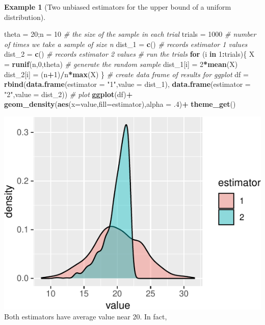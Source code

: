 \documentclass[
]{book}
\newenvironment{Shaded}{\begin{snugshade}}{\end{snugshade}}
\newcommand{\AttributeTok}[1]{\textcolor[rgb]{0.13,0.29,0.53}{#1}}
\newcommand{\CommentTok}[1]{\textcolor[rgb]{0.56,0.35,0.01}{\textit{#1}}}
\newcommand{\ControlFlowTok}[1]{\textcolor[rgb]{0.13,0.29,0.53}{\textbf{#1}}}
\newcommand{\DecValTok}[1]{\textcolor[rgb]{0.00,0.00,0.81}{#1}}
\newcommand{\FunctionTok}[1]{\textcolor[rgb]{0.13,0.29,0.53}{\textbf{#1}}}
\newcommand{\NormalTok}[1]{#1}
\newcommand{\OtherTok}[1]{\textcolor[rgb]{0.56,0.35,0.01}{#1}}
\newcommand{\SpecialCharTok}[1]{\textcolor[rgb]{0.81,0.36,0.00}{\textbf{#1}}}
\newcommand{\StringTok}[1]{\textcolor[rgb]{0.31,0.60,0.02}{#1}}
\theoremstyle{definition}
\theoremstyle{definition}
\newtheorem{example}{Example}[chapter]
\theoremstyle{definition}
\theoremstyle{definition}
\theoremstyle{remark}
\begin{document}
\begin{example}[Two unbiased estimators for the upper bound of a uniform distribution]
\begin{Shaded}
\begin{Highlighting}[]
\NormalTok{theta }\OtherTok{=} \DecValTok{20}\NormalTok{;n }\OtherTok{=} \DecValTok{10} \CommentTok{\# the size of the sample in each trial}
\NormalTok{trials }\OtherTok{=} \DecValTok{1000} \CommentTok{\# number of times we take a sample of size n}
\NormalTok{dist\_1 }\OtherTok{=} \FunctionTok{c}\NormalTok{() }\CommentTok{\# records estimator 1 values}
\NormalTok{dist\_2 }\OtherTok{=} \FunctionTok{c}\NormalTok{() }\CommentTok{\# records estimator 2 values}
\CommentTok{\# run the trials}
\ControlFlowTok{for}\NormalTok{ (i }\ControlFlowTok{in} \DecValTok{1}\SpecialCharTok{:}\NormalTok{trials)\{}
\NormalTok{  X }\OtherTok{=} \FunctionTok{runif}\NormalTok{(n,}\DecValTok{0}\NormalTok{,theta) }\CommentTok{\# generate the random sample}
\NormalTok{  dist\_1[i] }\OtherTok{=} \DecValTok{2}\SpecialCharTok{*}\FunctionTok{mean}\NormalTok{(X)}
\NormalTok{  dist\_2[i] }\OtherTok{=}\NormalTok{ (n}\SpecialCharTok{+}\DecValTok{1}\NormalTok{)}\SpecialCharTok{/}\NormalTok{n}\SpecialCharTok{*}\FunctionTok{max}\NormalTok{(X)}
\NormalTok{\}}
\CommentTok{\# create data frame of results for ggplot}
\NormalTok{df }\OtherTok{=} \FunctionTok{rbind}\NormalTok{(}\FunctionTok{data.frame}\NormalTok{(}\AttributeTok{estimator =} \StringTok{"1"}\NormalTok{,}\AttributeTok{value =}\NormalTok{ dist\_1),}
           \FunctionTok{data.frame}\NormalTok{(}\AttributeTok{estimator =} \StringTok{"2"}\NormalTok{,}\AttributeTok{value =}\NormalTok{ dist\_2))}
\CommentTok{\# plot}
\FunctionTok{ggplot}\NormalTok{(df)}\SpecialCharTok{+}
  \FunctionTok{geom\_density}\NormalTok{(}\FunctionTok{aes}\NormalTok{(}\AttributeTok{x=}\NormalTok{value,}\AttributeTok{fill=}\NormalTok{estimator),}\AttributeTok{alpha =}\NormalTok{ .}\DecValTok{4}\NormalTok{)}\SpecialCharTok{+}
  \FunctionTok{theme\_get}\NormalTok{()}
\end{Highlighting}
\end{Shaded}

\includegraphics{math340-notes_files/figure-latex/unnamed-chunk-39-1.pdf}
Both estimators have average value near 20. In fact,


\end{example}
\end{document}
